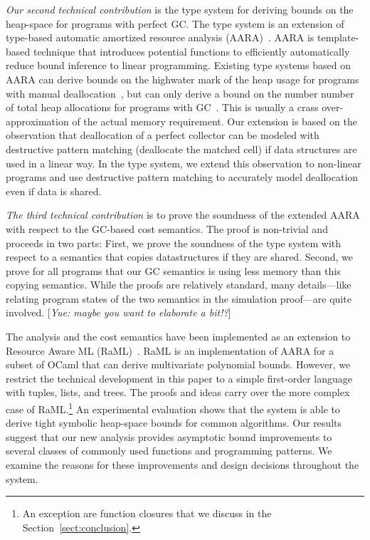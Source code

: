 \documentclass{easychair}
\newcommand{\yue}[1]{{\color{blue} [\emph{Yue: #1}]}}
\theoremstyle{definition}
\begin{document}
\emph{Our second technical contribution} is the type system for
deriving bounds on the heap-space for programs with perfect GC. The
type system is an extension of type-based automatic amortized resource
analysis
(AARA)~\cite{Jost03,Jost10,VasconcelosJFH15,HoffmannAH10,HoffmannW15,NgoDFH16}. AARA
is template-based technique that introduces potential functions to
efficiently automatically reduce bound inference to linear
programming. Existing type systems based on AARA can derive bounds on
the highwater mark of the heap usage for programs with manual
deallocation~\cite{Jost10}, but can only derive a bound on the number
number of total heap allocations for programs with
GC~\cite{HoffmannW15}. This is usually a crass over-approximation of
the actual memory requirement. Our extension is based on the
observation that deallocation of a perfect collector can be modeled
with destructive pattern matching (deallocate the matched cell) if
data structures are used in a linear way. In the type system, we
extend this observation to non-linear programs and use destructive
pattern matching to accurately model deallocation even if data is
shared.

\emph{The third technical contribution} is to prove the soundness of
the extended AARA with respect to the GC-based cost semantics. The
proof is non-trivial and proceeds in two parts: First, we prove the
soundness of the type system with respect to a semantics that copies
datastructures if they are shared. Second, we prove for all programs
that our GC semantics is using less memory than this copying
semantics. While the proofs are relatively standard, many
details---like relating program states of the two semantics in the
simulation proof---are quite involved. \yue{maybe you want to
  elaborate a bit!?}

The analysis and the cost semantics have been implemented as an
extension to Resource Aware ML (RaML)~\cite{HoffmannAH10,HoffmannW15}. RaML is an
implementation of AARA for a subset of OCaml that can derive
multivariate polynomial bounds. However, we restrict the technical
development in this paper to a simple first-order language with
tuples, lists, and trees. The proofs and ideas carry over the more
complex case of RaML.\footnote{An exception are function closures that
  we discuss in the Section~\ref{sect:conclusion}.}
%
An experimental evaluation shows that the system is able to derive
tight symbolic heap-space bounds for common algorithms. Our results
suggest that our new analysis provides asymptotic bound improvements
to several classes of commonly used functions and programming
patterns. We examine the reasons for these improvements and design
decisions throughout the system.
\end{document}
